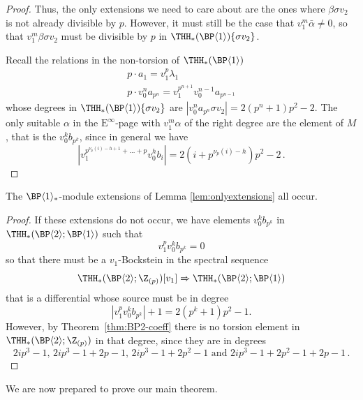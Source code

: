 \begin{proof}
  Thus, the only extensions we need to care about are the ones where $\beta \sigma v_2$ is not already divisible by $p$. However, it must still be the case that $v_1^m \bar{\alpha} \neq 0$, so that $v_1^m \beta \sigma v_2$ must be divisible by $p$ in $\THH_*(\BP \langle 1 \rangle)\{\sigma v_2\}$.

  Recall the relations in the non-torsion of $\THH_*(\BP \langle 1 \rangle)$
  \[
    \begin{gathered}
      p\cdot a_1 = v_1^p \lambda_1 \\
      p\cdot v_0^n a_{p^n} = v_1^{p^{n+1}}v_0^{n-1} a_{p^{n-1}}
    \end{gathered}
  \]
  whose degrees in $\THH_*(\BP \langle 1 \rangle)\{ \sigma v_2\}$ are $|v_0^n a_{p^n}\sigma v_2| = 2(p^n + 1)p^2 - 2$. The only suitable $\alpha$ in the $\mathrm{E}^\infty$-page with $v_1^m \alpha$ of the right degree are the element of $M$, that is the $v_0^k b_{p^k}$, since in general we have
  \[
    |v_1^{p^{\nu_p(i) - h + 1 } + \dots + p} v_0^h b_i| = 2(i + p^{\nu_p(i) - h})p^2 - 2 \,.
  \]
\end{proof}

\begin{proposition}
  The $\BP\langle 1\rangle_*$-module extensions of Lemma \ref{lem:onlyextensions} all occur. 
\end{proposition}

\begin{proof}
  If these extensions do not occur, we have elements $v_0^k b_{p^k}$ in $\THH_*(\BP \langle 2 \rangle ; \BP \langle 1 \rangle)$ such that
  \[
    v_1^p v_0^k b_{p^k} = 0
  \]
  so that there must be a $v_1$-Bockstein in the spectral sequence
  \[
    \THH_*(\BP \langle 2 \rangle ; \Z_{(p)})[v_1] \Rightarrow \THH_*(\BP \langle 2 \rangle ; \BP \langle 1 \rangle)
  \]
  that is a differential whose source must be in degree
  \[
    |v_1^p v_0^k b_{p^k}| + 1 = 2(p^k + 1)p^2 - 1.
  \]
  However, by Theorem~\ref{thm:BP2-coeff} there is no torsion element in $\THH_*(\BP \langle 2 \rangle; \Z_{(p)})$ in that degree, since they are in degrees
  \[
    2ip^3 - 1 ,\, 2ip^3 - 1 + 2p - 1,\, 2ip^3 - 1 + 2p^2 - 1 \text{ and } 2ip^3 - 1 + 2p^2 - 1 + 2p - 1 \,.
  \]
\end{proof}

We are now prepared to prove our main theorem.


